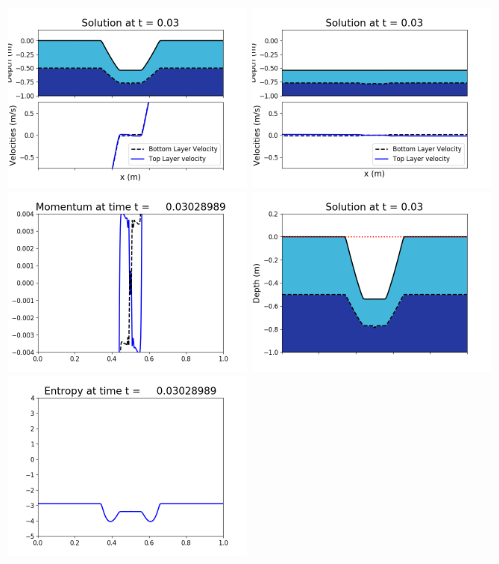 \documentclass[11pt]{article}
\begin{document}
\vskip 10pt 
\includegraphics[width=0.475\textwidth]{frame0087fig1001.png}
\includegraphics[width=0.475\textwidth]{frame0087fig1002.png}
\vskip 10pt 
\includegraphics[width=0.475\textwidth]{frame0087fig1003.png}
\includegraphics[width=0.475\textwidth]{frame0087fig1006.png}
\vskip 10pt 
\includegraphics[width=0.475\textwidth]{frame0087fig1007.png}
\end{document}
